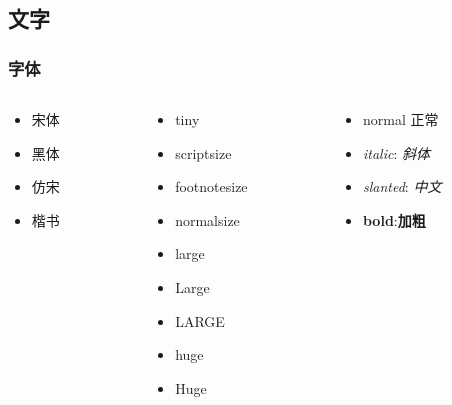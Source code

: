 \documentclass[
    10pt,
    pdf,
    UTF8,
    aspectratio=169
]{ctexbeamer}
\begin{document}
\subsection{文字}

\begin{frame}
    \frametitle{字体}
    \begin{columns}
        \begin{column}{0.2\textwidth}
            \begin{itemize}
                \item {\songti 宋体}
                \item {\heiti 黑体}
                \item {\fangsong 仿宋}
                \item {\kaishu 楷书}
            \end{itemize}
        \end{column}
        \begin{column}{0.4\textwidth}
            \begin{itemize}
                \item {\tiny tiny}
                \item {\scriptsize scriptsize}
                \item {\footnotesize footnotesize}
                \item {\normalsize normalsize}
                \item {\large large}
                \item {\Large Large}
                \item {\LARGE LARGE}
                \item {\huge huge}
                \item {\Huge Huge}
            \end{itemize}
        \end{column}
        \begin{column}{0.4\textwidth}
            \begin{itemize}
                \item normal 正常
                \item \textit{italic}: \textit{斜体}
                \item \textsl{slanted}: \textsl{中文}
                \item \textbf{bold}:\textbf{加粗}
            \end{itemize}
        \end{column}
    \end{columns}
\end{frame}
\end{document}
